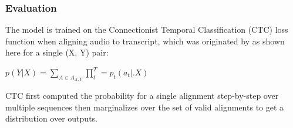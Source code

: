 \subsubsection{Evaluation}

The model is trained on the Connectionist Temporal Classification (CTC) loss function when aligning audio to transcript, which was originated by \cite{CTC} as shown here for a single (X, Y) pair: 
\begin{center}
$p(Y | X) = \sum_{A\in A_{X, Y}} \prod_t^T = p_t(a_t |. X)$    
\end{center}

CTC first computed the probability for a single alignment step-by-step over multiple sequences then marginalizes over the set of valid alignments to get a distribution over outputs.  